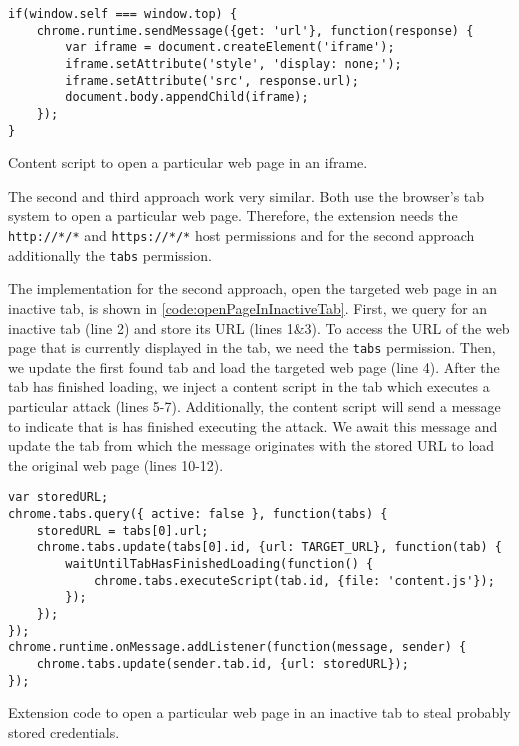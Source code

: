 	\begin{code}
		\begin{lstlisting}
if(window.self === window.top) {
	chrome.runtime.sendMessage({get: 'url'}, function(response) {
		var iframe = document.createElement('iframe');
		iframe.setAttribute('style', 'display: none;');
		iframe.setAttribute('src', response.url);
		document.body.appendChild(iframe);
	});
}
\end{lstlisting}
		\caption{Content script to open a particular web page in an iframe.}
		\label{code:openWebPageInIframe}
	\end{code}
	
	The second and third approach work very similar. Both use the browser's tab system to open a particular web page. Therefore, the extension needs the \texttt{http://*/*} and \texttt{https://*/*} host permissions and for the second approach additionally the \texttt{tabs} permission. 
	
	The implementation for the second approach, open the targeted web page in an inactive tab, is shown in \autoref{code:openPageInInactiveTab}. First, we query for an inactive tab (line 2) and store its URL (lines 1\&3). To access the URL of the web page that is currently displayed in the tab, we need the \texttt{tabs} permission. Then, we update the first found tab and load the targeted web page (line 4). After the tab has finished loading, we inject a content script in the tab which executes a particular attack (lines 5-7). Additionally, the content script will send a message to indicate that is has finished executing the attack. We await this message and update the tab from which the message originates with the stored URL to load the original web page (lines 10-12).
		
	\begin{code}
		\begin{lstlisting}
var storedURL;
chrome.tabs.query({ active: false }, function(tabs) {	
	storedURL = tabs[0].url;
	chrome.tabs.update(tabs[0].id, {url: TARGET_URL}, function(tab) {
		waitUntilTabHasFinishedLoading(function() {
			chrome.tabs.executeScript(tab.id, {file: 'content.js'});	
		});
	});
});
chrome.runtime.onMessage.addListener(function(message, sender) {
	chrome.tabs.update(sender.tab.id, {url: storedURL});
});
\end{lstlisting}
		\caption{Extension code to open a particular web page in an inactive tab to steal probably stored credentials.}
		\label{code:openPageInInactiveTab}
	\end{code}
	
